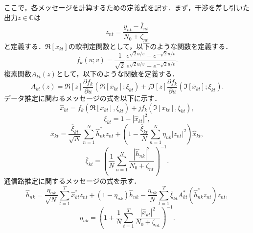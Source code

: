 ここで，各メッセージを計算するための定義式を記す．まず，干渉を差し引いた出力$z\in\mathbb{C}$は
\begin{equation} 
	\label{eq:z}
	z_{nt}=\frac{y_{nt}-\overline{I}_{nt}}{N_{0}+\zeta_{nt}}
\end{equation}
と定義する．$\Re[x_{kt}]$の軟判定関数として，以下のような関数を定義する．
\begin{equation} 
	\label{eq:fk}
	f_{k}(u;v)=\frac{1}{\sqrt{2}}
			\frac{e^{\sqrt{2}u/v}-e^{-\sqrt{2}u/v}}{e^{\sqrt{2}u/v}+e^{-\sqrt{2}u/v}}.
\end{equation}
複素関数$A_{kt}(z)$として，以下のような関数を定義する．
\begin{equation} 
	\label{eq:Akt}
	A_{kt}(z)=\Re[z]\frac{\partial f_{k}}{\partial u}(\Re[\overline{x}_{kt}];\overline{\xi}_{kt})+j\Im[z]\frac{\partial f_{k}}{\partial u}(\Im[\overline{x}_{kt}];\overline{\xi}_{kt}).
\end{equation}
データ推定に関わるメッセージの式を以下に示す．
\begin{equation} 
	\label{eq:x_h}
	\hat{x}_{kt}=f_{k}(\Re[\overline{x}_{kt}],\overline{\xi}_{kt})+jf_{k}(\Im[\overline{x}_{kt}],\overline{\xi}_{kt}),
\end{equation}
\begin{equation} 
	\label{eq:xi}
	\xi_{kt} = 1 - |\hat{x}_{kt}|^2,
\end{equation}
\begin{equation} 
	\label{eq:x_b}
	\overline{x}_{kt} = 
		\frac{\overline{\xi}_{kt}}{\sqrt{N}}
			\sum_{n=1}^{N}\hat{h}^{*}_{nk}z_{nt}
			+\left(
				1-\frac{\overline{\xi}_{kt}}{N}\sum_{n=1}^{N}\eta_{nk}|z_{nt}|^2
			\right)
			\hat{x}_{kt},
\end{equation}
\begin{equation} 
	\label{eq:xi_b}
	\overline{\xi}_{kt}=
	\left(
		\frac{1}{N}
		\sum_{n=1}^{N}
			\frac
			{|\hat{h}_{nk}|^{2}}
			{N_{0}+\zeta_{nt}}
	\right)^{-1}.
\end{equation}
通信路推定に関するメッセージの式を示す．
\begin{equation}
	\label{eq:h_h}
	\hat{h}_{nk}=
	\frac
		{\eta_{nk}}
		{\sqrt{N}}
	\sum_{t=1}^{T}
		\hat{x}^{*}_{kt}z_{nt}
	+
	\left(
		1-\eta_{nk}
	\right)
	\hat{h}_{nk}
	-
	\frac
		{\eta_{nk}}
		{N}
	\sum_{t=1}^{T}
		\overline{\xi}_{kt}
		A^{*}_{kt}
		\left(
			\hat{h}_{nk}^{*}
			z_{nt}
		\right)
		z_{nt},	
\end{equation}
\begin{equation}
	\label{eq:eta}
	\eta_{nk}=
	\left(
		1+
		\frac{1}{N}
		\sum^{T}_{t=1}
			\frac
			{|\hat{x}_{kt}|^{2}}
			{N_{0}+\zeta_{nt}}
	\right)^{-1}.
\end{equation}
